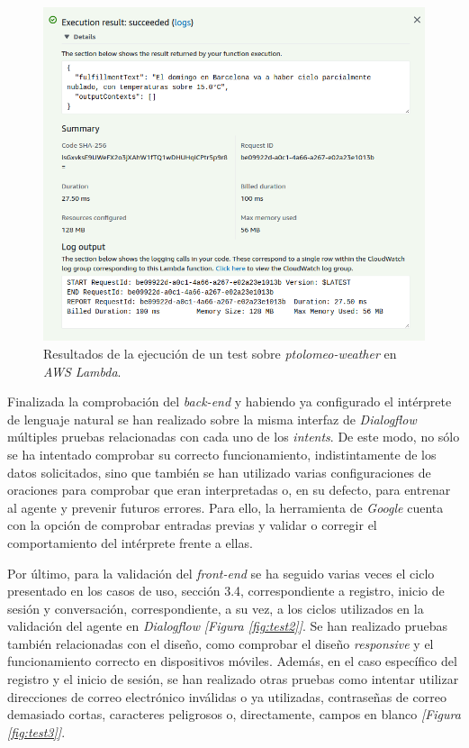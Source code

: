 \documentclass[11pt,spanish,listoffigures]{tfgetsinf}
\begin{document}
\begin{figure}[h!]
    \centering
    \includegraphics[width=1\textwidth]{images/img20.png}
    \caption{Resultados de la ejecución de un test sobre \textit{ptolomeo-weather} en \textit{AWS Lambda}.}
    \label{fig:test1}
\end{figure}

Finalizada la comprobación del \textit{back-end} y habiendo ya configurado el intérprete de lenguaje natural se han realizado sobre la misma interfaz de \textit{Dialogflow} múltiples pruebas relacionadas con cada uno de los \textit{intents}. De este modo, no sólo se ha intentado comprobar su correcto funcionamiento, indistintamente de los datos solicitados, sino que también se han utilizado varias configuraciones de oraciones para comprobar que eran interpretadas o, en su defecto, para entrenar al agente y prevenir futuros errores. Para ello, la herramienta de \textit{Google} cuenta con la opción de comprobar entradas previas y validar o corregir el comportamiento del intérprete frente a ellas. 

Por último, para la validación del \textit{front-end} se ha seguido varias veces el ciclo presentado en los casos de uso, sección 3.4, correspondiente a registro, inicio de sesión y conversación, correspondiente, a su vez, a los ciclos utilizados en la validación del agente en \textit{Dialogflow} \textit{[Figura \ref{fig:test2}]}. Se han realizado pruebas también relacionadas con el diseño, como comprobar el diseño \textit{responsive} y el funcionamiento correcto en dispositivos móviles. Además, en el caso específico del registro y el inicio de sesión, se han realizado otras pruebas como intentar utilizar direcciones de correo electrónico inválidas o ya utilizadas, contraseñas de correo demasiado cortas, caracteres peligrosos o, directamente, campos en blanco \textit{[Figura \ref{fig:test3}]}. 
\end{document}
